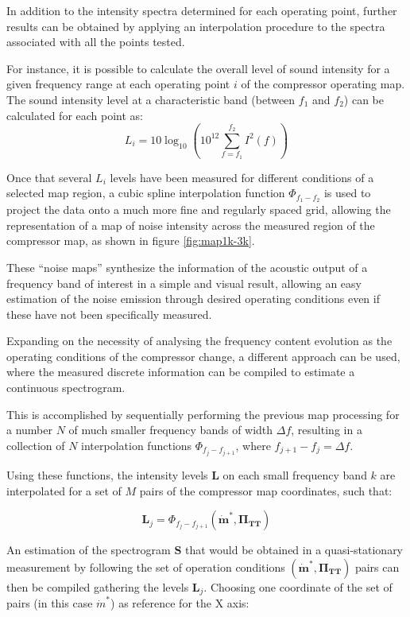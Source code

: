 In addition to the intensity spectra determined for each operating point, further results can be obtained by applying an interpolation procedure to the spectra associated with all the points tested.

For instance, it is possible to calculate the overall level of sound intensity for a given frequency range at each operating point $i$ of the compressor operating map. The sound intensity level at a characteristic band (between $f_1$ and $f_2$) can be calculated for each point as:
\begin{equation}\label{eq:point_level}
  L_i=10\log_{10}\left(10^{12}\sum_{f=f_1}^{f_2}I^2(f)\right)
\end{equation}

Once that several $L_i$ levels have been measured for different conditions of a selected map region, a cubic spline interpolation function $\Phi_{f_1-f_2}$ is used to project the data onto a much more fine and regularly spaced grid, allowing the representation of a map of noise intensity across the measured region of the compressor map, as shown in figure \ref{fig:map1k-3k}.

These ``noise maps'' synthesize the information of the acoustic output of a frequency band of interest in a simple and visual result, allowing an easy estimation of the noise emission through desired operating conditions even if these have not been specifically measured.

Expanding on the necessity of analysing the frequency content evolution as the operating conditions of the compressor change, a different approach can be used, where the measured discrete information can be compiled to estimate a continuous spectrogram.

This is accomplished by sequentially performing the previous map processing for a number $N$ of much smaller frequency bands of width $\Delta f$, resulting in a collection of $N$ interpolation functions $\Phi_{f_j-f_{j+1}}$, where $f_{j+1}-f_j = \Delta f$.

Using these functions, the intensity levels $\mathbf L$ on each small frequency band $k$ are interpolated for a set of $M$ pairs of the compressor map coordinates, such that:

\begin{equation}
 \mathbf L_j=\Phi_{f_j-f_{j+1}}(\bm{\dot m^*},\bm{\Pi_\text{TT}})
\end{equation}

An estimation of the spectrogram $\mathbf S$ that would be obtained in a quasi-stationary measurement by following the set of operation conditions $(\bm{\dot m^*},\bm{\Pi_\text{TT}})$ pairs can then be compiled gathering the levels $\mathbf L_j$. Choosing one coordinate of the set of pairs (in this case $\dot m^*$) as reference for the X axis:

